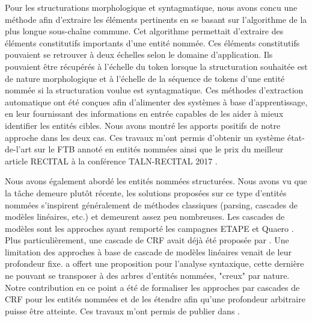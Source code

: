 \documentclass[PhD-Yoann-Dupont.tex]{subfiles}
\begin{document}
Pour les structurations morphologique et syntagmatique, nous avons concu une méthode afin d'extraire les éléments pertinents en se basant sur l'algorithme de la plus longue sous-chaîne commune. Cet algorithme permettait d'extraire des éléments constitutifs importants d'une entité nommée. Ces éléments constitutifs pouvaient se retrouver à deux échelles selon le domaine d'application. Ils pouvaient être récupérés à l'échelle du token lorsque la structuration souhaitée est de nature morphologique et à l'échelle de la séquence de tokens d'une entité nommée si la structuration voulue est syntagmatique. Ces méthodes d'extraction automatique ont été conçues afin d'alimenter des systèmes à base d'apprentissage, en leur fournissant des informations en entrée capables de les aider à mieux identifier les entités cibles. Nous avons montré les apports positifs de notre approche dans les deux cas. Ces travaux m'ont permis d'obtenir un système état-de-l'art sur le FTB annoté en entités nommées ainsi que le prix du meilleur article RECITAL à la conférence TALN-RECITAL 2017 \citep{dupont2017exploration}.

Nous avons également abordé les entités nommées structurées. Nous avons vu que la tâche demeure plutôt récente, les solutions proposées sur ce type d'entités nommées s'inspirent généralement de méthodes classiques (parsing, cascades de modèles linéaires, etc.) et demeurent assez peu nombreuses. Les cascades de modèles sont les approches ayant remporté les campagnes ETAPE et Quaero \citep{dinarelli2012,raymond2013robust}. Plus particulièrement, une cascade de CRF avait déjà été proposée par \citet{raymond2013robust}. Une limitation des approches à base de cascade de modèles linéaires venait de leur profondeur fixe. \citet{Tsuruoka09} a offert une proposition pour l'analyse syntaxique, cette dernière ne pouvant se transposer à des arbres d'entités nommées, "creux" par nature. Notre contribution en ce point a été de formaliser les approches par cascades de CRF pour les entités nommées et de les étendre afin qu'une profondeur arbitraire puisse être atteinte. Ces travaux m'ont permis de publier dans \citet{dupont2017b}.
\end{document}
